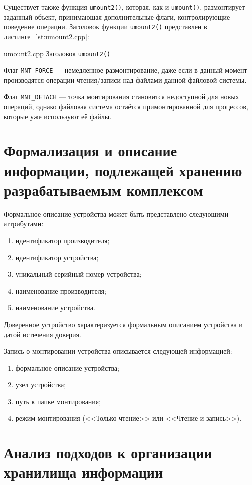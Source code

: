 Существует также функция \texttt{umount2()}, которая, как и \texttt{umount()}, размонтирует заданный объект, 
принимающая дополнительные флаги, контролирующие поведение операции. Заголовок функции 
\texttt{umount2()} представлен в листинге~\ref{lst:umount2.cpp}: 

    {umount2.cpp}
    {Заголовок \texttt{umount2()}}

Флаг \texttt{MNT\_FORCE} --- немедленное размонтирование, даже если в данный момент производятся операции чтения/записи над файлами
данной файловой системы.

Флаг \texttt{MNT\_DETACH} --- точка монтирования становится недоступной для новых операций, однако файловая система остаётся 
примонтированной для процессов, которые уже используют её файлы.

\section{Формализация и описание информации, подлежащей хранению разрабатываемым комплексом}

Формальное описание устройства может быть представлено следующими аттрибутами:

\begin{enumerate}
    \item идентификатор производителя;
    \item идентификатор устройства;
    \item уникальный серийный номер устройства;
    \item наименование производителя;
    \item наименование устройства.
\end{enumerate}

Доверенное устройство характеризуется формальным описанием устройства и датой истечения доверия.

Запись о монтировании устройства описывается следующей информацией:

\begin{enumerate}
    \item формальное описание устройства;
    \item узел устройства;
    \item путь к папке монтирования;
    \item режим монтирования (<<Только чтение>> или <<Чтение и запись>>).
\end{enumerate}

\section{Анализ подходов к организации хранилища информации}

